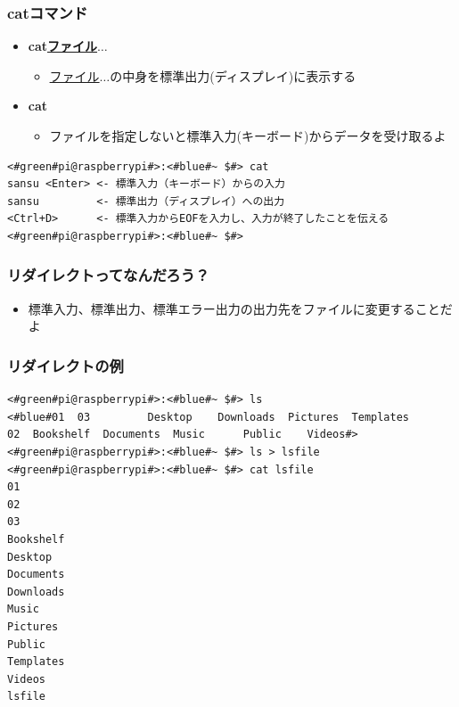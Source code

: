 \documentclass[slide03.tex]{subfiles}
\begin{document}
\begin{frame}[fragile]
    \frametitle{catコマンド}
    \begin{itemize}
        \item {\bf cat\textvisiblespace\underline{ファイル}$\ldots$}
        \begin{itemize}
            \small
            \item[] \underline{ファイル}$\ldots$の中身を標準出力(ディスプレイ)に表示する
        \end{itemize}
        \item {\bf cat}
        \begin{itemize}
            \small
            \item[] ファイルを指定しないと標準入力(キーボード)からデータを受け取るよ
        \end{itemize}
    \end{itemize}
    \begin{lstlisting}[title=catの標準入力・標準出力, label=stdioCat]
<#green#pi@raspberrypi#>:<#blue#~ $#> cat
sansu <Enter> <- 標準入力（キーボード）からの入力
sansu         <- 標準出力（ディスプレイ）への出力
<Ctrl+D>      <- 標準入力からEOFを入力し、入力が終了したことを伝える
<#green#pi@raspberrypi#>:<#blue#~ $#>
    \end{lstlisting}
\end{frame}

\begin{frame}
    \frametitle{リダイレクトってなんだろう？}
    \vspace{1em}
    \begin{itemize}
        \item 標準入力、標準出力、標準エラー出力の出力先をファイルに変更することだよ
    \end{itemize}
    \begin{figure}
        \centering
        
    \end{figure}
\end{frame}

\begin{frame}[fragile]
    \frametitle{リダイレクトの例}
    \begin{lstlisting}[title=lsの出力をリダイレクトする, label=redirectLs]
<#green#pi@raspberrypi#>:<#blue#~ $#> ls
<#blue#01  03         Desktop    Downloads  Pictures  Templates
02  Bookshelf  Documents  Music      Public    Videos#>
<#green#pi@raspberrypi#>:<#blue#~ $#> ls > lsfile
<#green#pi@raspberrypi#>:<#blue#~ $#> cat lsfile
01
02
03
Bookshelf
Desktop
Documents
Downloads
Music
Pictures
Public
Templates
Videos
lsfile
    \end{lstlisting}
\end{frame}
\end{document}
